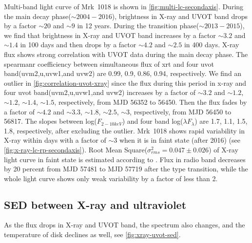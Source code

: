 \documentclass[twocolumn]{aastex63}
\begin{document}
Multi-band light curve of Mrk~1018 is shown in \autoref{fig:multi-lc-secondaxis}. During the main decay phase($\sim 2004-2016$), brightness in X-ray and UVOT band drops by a factor $\sim20$ and $\sim9$ in 12 years. During the transition phase($\sim 2013-2015$), we find that brightness in X-ray and UVOT band increases by a factor $\sim3.2$ and $\sim1.4$ in 100 days and then drops by a factor $\sim4.2$ and $\sim2.5$ in 400 days. X-ray flux shows strong correlation with UVOT data during the main decay phase. The spearmanr coefficiency between simultaneous flux of xrt and four uvot band(uvm2,u,uvw1,and uvw2) are 0.99, 0.9, 0.86, 0.94, respectively. We find an outlier in \autoref{fig:correlation-uvot-xray} since the flux during this period in x-ray and four uvot band(uvm2,u,uvw1,and uvw2) increases by a factor of $\sim 3.2$ and $\sim 1.2$, $\sim 1.2$, $\sim 1.4$, $\sim 1.5$, respectively, from MJD 56352 to 56450. Then the flux fades by a factor of $\sim 4.2$ and $\sim 3.3$, $\sim 1.8$, $\sim 2.5$, $\sim 3$, respectively, from MJD 56450 to 56817. The slopes between log($F_{2-10keV}$) and four band log($\lambda F_{\lambda}$) are 1.7, 1.1, 1.5, 1.8, respectively, after excluding the outlier. Mrk~1018 shows rapid variability in X-ray within days with a factor of $\sim3$ when it is in faint state (after 2016) (see \autoref{fig:x-ray-lc-rp-secondaxis}). Root Mean Square($\sigma^2_{rms} = 0.047 \pm 0.026 $) of X-ray light curve in faint state is estimated according to \citet{1999ApJ...524..667T}. Flux in radio band decreases by 20 percent from MJD 57481 to MJD 57719 after the type transition, while the whole light curve shows only weak variability by a factor of less than 2.

\subsection{SED between X-ray and ultraviolet}\label{subsec:xray-uvot-sed}
As the flux drops in X-ray and UVOT band, the spectrum also changes, and the temperature of disk declines as well, see \autoref{fig:xray-uvot-sed}.
\end{document}
